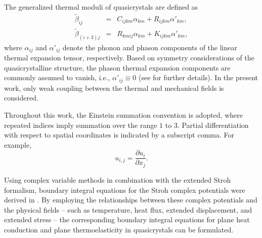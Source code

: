 The generalized thermal moduli of quasicrystals are defined as
\begin{equation}
	\begin{array}{rcl}
		\tilde{\beta}_{ij}&=&C_{ijkm}\alpha_{km}+R_{ijkm}\alpha'_{km},\\[4pt]
		\tilde{\beta}_{(i+3)j}&=&R_{kmij}\alpha_{km}+K_{ijkm}\alpha'_{km},
	\end{array}
	\label{KushnirEq6}
\end{equation}
where $\alpha_{ij}$ and $\alpha'_{ij}$ denote the phonon and phason
components of the linear thermal expansion tensor, respectively.
Based on symmetry considerations of the quasicrystalline structure,
the phason thermal expansion components are commonly assumed to vanish,
i.e., $\alpha'_{ij}\equiv0$ (see \cite{Kushnir20} for further details).
In the present work, only weak coupling between the thermal and
mechanical fields is considered.

Throughout this work, the Einstein summation convention is adopted,
where repeated indices imply summation over the range $1$ to $3$.
Partial differentiation with respect to spatial coordinates is
indicated by a subscript comma. For example,
\[
u_{i,j}=\frac{\partial u_i}{\partial x_j}.
\]

Using complex variable methods in combination with the extended Stroh
formalism, boundary integral equations for the Stroh complex potentials
were derived in \cite{Kushnir34}. By employing the relationships
between these complex potentials and the physical fields -- such
as temperature, heat flux, extended displacement, and extended stress
-- the corresponding boundary integral equations for plane heat conduction
and plane thermoelasticity in quasicrystals can be formulated.

